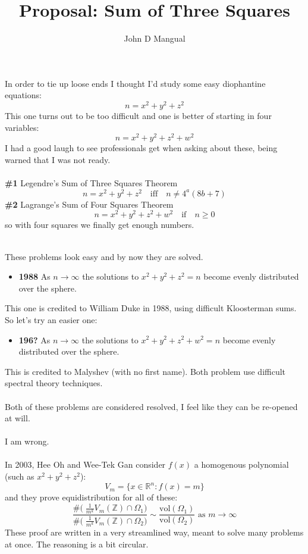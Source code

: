 \documentclass[12pt]{article}
\title{\textbf{Proposal: Sum of Three Squares}}
\author{John D Mangual}
\date{}
\begin{document}
\selectfont \fontsize{20}{25}\selectfont

\maketitle

\noindent In order to tie up loose ends I thought I'd study some easy diophantine equations:
$$ n = x^2 + y^2 + z^2 $$
This one turns out to be too difficult and one is better of starting in four variables:
$$ n = x^2 + y^2 + z^2 + w^2 $$
I had a good laugh to see professionals get when asking about these, being warned that I was not ready. \\ \\
\textbf{\#1} Legendre's Sum of Three Squares Theorem
$$ n = x^2 + y^2 + z^2  \quad\text{iff}\quad n \neq 4^a(8b+7)  $$ 
\textbf{\#2} Lagrange's Sum of Four Squares Theorem
$$ n = x^2 + y^2 + z^2 + w^2 \quad\text{if}\quad n \geq 0$$
so with four squares we finally get enough numbers. \\ \\

\newpage

\noindent These problems look easy and by now they are solved.
\begin{itemize}
\item \textbf{1988} As $n \to \infty$ the solutions to $x^2 + y^2 + z^2 = n$  become evenly distributed over the sphere.
\end{itemize}
This one is credited to William Duke in 1988, using
difficult Kloosterman sums.  So let's try an easier one:
\begin{itemize}
\item \textbf{196?} As $n \to \infty$ the solutions to $x^2 + y^2 + z^2 + w^2 = n$  become evenly distributed over the sphere.
\end{itemize}
This is credited to Malyshev (with no first name).  Both problem use difficult spectral theory techniques. \\ \\
Both of these problems are considered resolved, I feel like they can be re-opened at will. \\ \\
I am wrong. \\ \\
In 2003, Hee Oh and Wee-Tek Gan consider $f(x)$ a homogenous polynomial (such as $x^2 + y^2 + z^2$):
$$ V_m = \{ x \in \mathbb{R}^n : f(x) = m \}$$ 
and they prove equidistribution for all of these:
$$ \frac{\# \big( \;\frac{1}{m^k}V_m(\mathbb{Z})\cap \Omega_1 \big)}
{\# \big( \;\frac{1}{m^k}V_m(\mathbb{Z})\cap \Omega_2 \big)} 
\sim \frac{\mathrm{vol}(\Omega_1)}{\mathrm{vol}(\Omega_2)} \text{ as } m \to \infty$$
These proof are written in a very streamlined way, meant to solve many problems at once.  The reasoning is a bit circular.  
\end{document}
